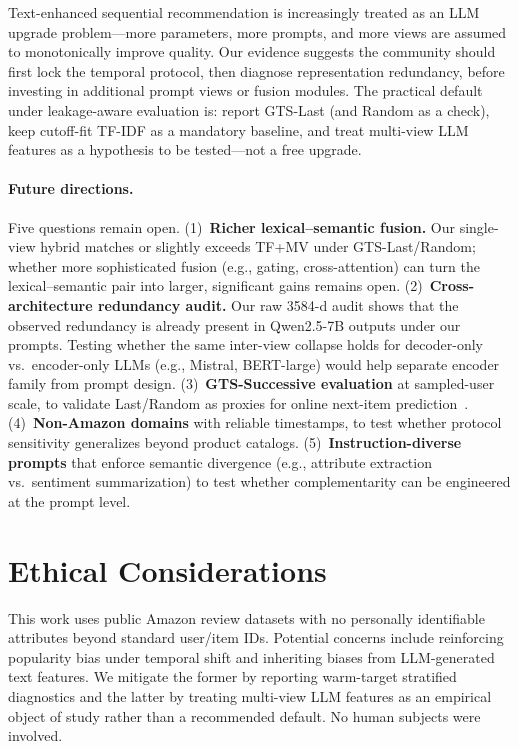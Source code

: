 \documentclass[sigconf,natbib=true,anonymous]{acmart}
\newcommand{\tfidf}{\textsc{TF-IDF}\xspace}
\newcommand{\tfmv}{\textsc{TF+MV}\xspace}
\begin{document}
Text-enhanced sequential recommendation is increasingly treated as an LLM upgrade problem---more parameters, more prompts, and more views are assumed to monotonically improve quality.
Our evidence suggests the community should first lock the temporal protocol, then diagnose representation redundancy, before investing in additional prompt views or fusion modules.
The practical default under leakage-aware evaluation is: report GTS-Last (and Random as a check), keep cutoff-fit \tfidf as a mandatory baseline, and treat multi-view LLM features as a hypothesis to be tested---not a free upgrade.

\paragraph{Future directions.}
Five questions remain open.
(1)~\textbf{Richer lexical--semantic fusion.}  Our single-view hybrid matches or slightly exceeds \tfmv under GTS-Last/Random; whether more sophisticated fusion (e.g., gating, cross-attention) can turn the lexical--semantic pair into larger, significant gains remains open.
(2)~\textbf{Cross-architecture redundancy audit.}  Our raw 3584-d audit shows that the observed redundancy is already present in Qwen2.5-7B outputs under our prompts.  Testing whether the same inter-view collapse holds for decoder-only vs.\ encoder-only LLMs (e.g., Mistral, BERT-large) would help separate encoder family from prompt design.
(3)~\textbf{GTS-Successive evaluation} at sampled-user scale, to validate Last/Random as proxies for online next-item prediction~\cite{gusak2025time}.
(4)~\textbf{Non-Amazon domains} with reliable timestamps, to test whether protocol sensitivity generalizes beyond product catalogs.
(5)~\textbf{Instruction-diverse prompts} that enforce semantic divergence (e.g., attribute extraction vs.\ sentiment summarization) to test whether complementarity can be engineered at the prompt level.

\section*{Ethical Considerations}
This work uses public Amazon review datasets with no personally identifiable attributes beyond standard user/item IDs.
Potential concerns include reinforcing popularity bias under temporal shift and inheriting biases from LLM-generated text features.
We mitigate the former by reporting warm-target stratified diagnostics and the latter by treating multi-view LLM features as an empirical object of study rather than a recommended default.
No human subjects were involved.
\end{document}
